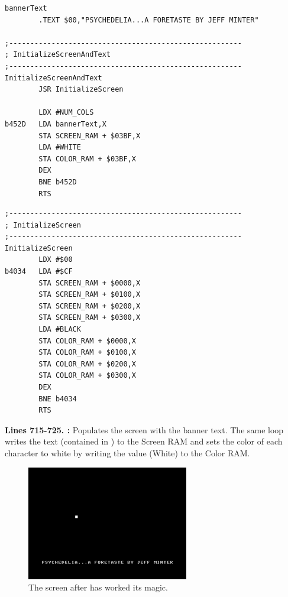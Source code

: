 \clearpage
\begin{lstlisting}
bannerText   
        .TEXT $00,"PSYCHEDELIA...A FORETASTE BY JEFF MINTER"

;-------------------------------------------------------
; InitializeScreenAndText
;-------------------------------------------------------
InitializeScreenAndText   
        JSR InitializeScreen

        LDX #NUM_COLS
b452D   LDA bannerText,X
        STA SCREEN_RAM + $03BF,X
        LDA #WHITE
        STA COLOR_RAM + $03BF,X
        DEX 
        BNE b452D
        RTS 
\end{lstlisting}

\bigskip
\bigskip
\bigskip
\bigskip
\bigskip
\bigskip
\bigskip
\bigskip
\bigskip
\begin{lstlisting}
;-------------------------------------------------------
; InitializeScreen
;-------------------------------------------------------
InitializeScreen   
        LDX #$00
b4034   LDA #$CF
        STA SCREEN_RAM + $0000,X
        STA SCREEN_RAM + $0100,X
        STA SCREEN_RAM + $0200,X
        STA SCREEN_RAM + $0300,X
        LDA #BLACK
        STA COLOR_RAM + $0000,X
        STA COLOR_RAM + $0100,X
        STA COLOR_RAM + $0200,X
        STA COLOR_RAM + $0300,X
        DEX 
        BNE b4034
        RTS 

\end{lstlisting}
\clearpage

\textbf{Lines 715-725. :} Populates the screen with the banner text. The same loop writes
the text (contained in ) to the Screen RAM and sets the color of each character to white by writing the
value  (White) to the Color RAM.

\begin{figure}[H]
    \centering
      \includegraphics[height=5cm]{src/listing_commentary/foretaste.png}
  \caption*{The screen after  has worked its magic.}
\end{figure}

